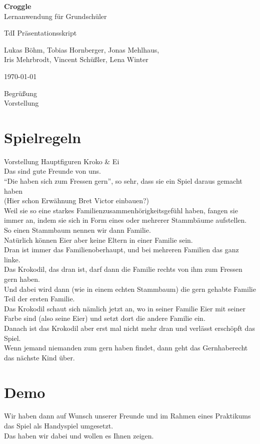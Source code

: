 \documentclass{scrartcl}
\begin{document}
	\begin{titlepage}
		\begin{center}
			{\huge \bfseries Croggle}\\[0.1cm]
			{\large  Lernanwendung für Grundschüler}
		\end{center}


		\begin{center}
			{\Large TdI Präsentationsskript}\\[0.5cm]
		\end{center}
		\begin{center}
			{Lukas Böhm, Tobias Hornberger, Jonas Mehlhaus, \\ Iris Mehrbrodt, Vincent Schüßler, Lena Winter} \\[1cm]
		\end{center}

		\begin{center}
			{\large \today}
		\end{center}
	\end{titlepage}

	Begrüßung\\
	Vorstellung
	\section{Spielregeln} 
	Vorstellung Hauptfiguren Kroko \& Ei\\
	Das sind gute Freunde von uns.\\
	"`Die haben sich zum Fressen gern"', so sehr, dass sie ein Spiel daraus gemacht haben\\
	(Hier schon Erwähnung Bret Victor einbauen?)\\
	Weil sie so eine starkes Familienzusammenhörigkeitsgefühl haben, fangen sie immer an, indem sie sich in Form eines oder mehrerer Stammbäume aufstellen.\\
	So einen Stammbaum nennen wir dann Familie.\\
	Natürlich können Eier aber keine Eltern in einer Familie sein.\\
	Dran ist immer das Familienoberhaupt, und bei mehreren Familien das ganz linke.\\
	Das Krokodil, das dran ist, darf dann die Familie rechts von ihm zum Fressen gern haben.\\
	Und dabei wird dann (wie in einem echten Stammbaum) die gern gehabte Familie Teil der ersten Familie.\\
	Das Krokodil schaut sich nämlich jetzt an, wo in seiner Familie Eier mit seiner Farbe sind (also seine Eier) und setzt dort die andere Familie ein. \\
	Danach ist das Krokodil aber erst mal nicht mehr dran und verlässt erschöpft das Spiel.\\
	Wenn jemand niemanden zum gern haben findet, dann geht das Gernhaberecht das nächste Kind über.
	
	\section{Demo}
	Wir haben dann auf Wunsch unserer Freunde und im Rahmen eines Praktikums das Spiel als Handyspiel umgesetzt.\\
	Das haben wir dabei und wollen es Ihnen zeigen.
	
\end{document}
